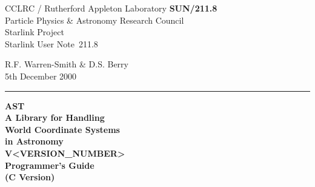 \documentclass[twoside,11pt]{article}
\newcommand{\stardoccategory}  {Starlink User Note}
\newcommand{\stardocinitials}  {SUN}
\newcommand{\stardocnumber}    {211.8}
\newcommand{\stardocnumber}    {210.8}
\newcommand{\stardocauthors}   {R.F. Warren-Smith \& D.S. Berry}
\newcommand{\stardocdate}      {5th December 2000}
\newcommand{\stardoctitle}     {AST\\
                                A Library for Handling\\
                                World Coordinate Systems\\
                                in Astronomy}
\newcommand{\stardocversion}   {V<VERSION_NUMBER>}
\newcommand{\stardocmanual}    {Programmer's Guide\\(C Version)}
\newcommand{\stardocmanual}    {Programmer's Guide\\(Fortran Version)}
\newcommand{\stardocname}{\stardocinitials /\stardocnumber}
\newenvironment{latexonly}{}{}
\begin{document}
\thispagestyle{empty}

\begin{latexonly}
   CCLRC / {\sc Rutherford Appleton Laboratory} \hfill {\bf \stardocname}\\
   {\large Particle Physics \& Astronomy Research Council}\\
   {\large Starlink Project\\}
   {\large \stardoccategory\ \stardocnumber}
   \begin{flushright}
   \stardocauthors\\
   \stardocdate
   \end{flushright}
   \vspace{-4mm}
   \rule{\textwidth}{0.5mm}
   \vspace{-7mm}
   \begin{center}
   {\Huge\bf  \stardoctitle \\ [2.0ex]}
   {\LARGE\bf \stardocversion \\ [1.0ex]}
   {\Huge\bf  \stardocmanual}
   \end{center}


\end{latexonly}
\end{document}

